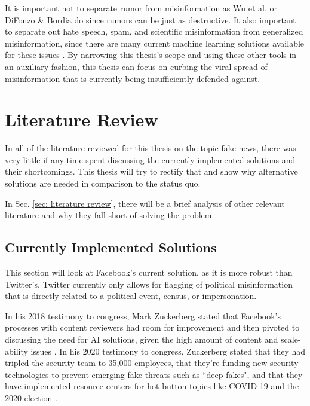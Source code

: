 \documentclass[preprint,review,12pt]{elsarticle}
\begin{document}
It is important not to separate rumor from misinformation as Wu et al. or DiFonzo \& Bordia do since rumors can be just as destructive. It also important to separate out hate speech, spam, and scientific misinformation from generalized misinformation, since there are many current machine learning solutions available for these issues \cite{xu2019exploiting,wang2010detecting,ahmed2018detecting,al2019spam,oriola2020evaluating,gaydhani2018detecting,al2020lies,farrell2019evidence}. By narrowing this thesis's scope and using these other tools in an auxiliary fashion, this thesis can focus on curbing the viral spread of misinformation that is currently being insufficiently defended against. 

\section{Literature Review}
In all of the literature reviewed for this thesis on the topic fake news, there was very little if any time spent discussing the currently implemented solutions and their shortcomings. This thesis will try to rectify that and show why alternative solutions are needed in comparison to the status quo.

In Sec. \ref{sec: literature review}, there will be a brief analysis of other relevant literature and why they fall short of solving the problem.

\subsection{Currently Implemented Solutions}
\label{sec: currently implemented solutions}
This section will look at Facebook's current solution, as it is more robust than Twitter's. Twitter currently only allows for flagging of political misinformation that is directly related to a political event, census, or impersonation.

In his 2018 testimony to congress, Mark Zuckerberg stated that Facebook's processes with content reviewers had room for improvement and then pivoted to discussing the need for AI solutions, given the high amount of content and scale-ability issues \cite{energy2018facebook}. In his 2020 testimony to congress, Zuckerberg stated that they had tripled the security team to 35,000 employees, that they're funding new security technologies to prevent emerging fake threats such as ``deep fakes", and that they have implemented resource centers for hot button topics like COVID-19 and the 2020 election \cite{zuckerberg2020}.
\end{document}
